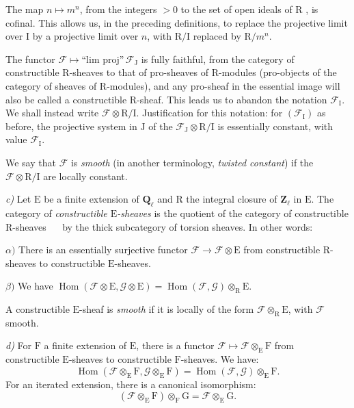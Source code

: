 \documentclass[11pt,leqno]{article}
\newcommand{\Page}[1]{\ifvmode\noindent\else\unskip\ \fi{\footnotesize\textcolor{gray}{[p.\,#1]}}\ \ignorespaces}
\begin{document}
The map \(n\mapsto m^n\), from the integers \(>0\) to the set of open ideals of \(\mathrm{R}\) , is cofinal. This allows us, in the preceding definitions, to replace the projective limit over \(\mathrm{I}\) by a projective limit over \(n\), with \(\mathrm{R}/\mathrm{I}\) replaced by \(\mathrm{R}/m^n\).

The functor \(\mathscr{F}\mapsto\text{“lim proj”}\,\mathscr{F}_{\mathrm{J}}\) is fully faithful, from the category of constructible \(\mathrm{R}\)-sheaves to that of pro-sheaves of \(\mathrm{R}\)-modules (pro-objects of the category of sheaves of \(\mathrm{R}\)-modules), and any pro-sheaf in the essential image will also be called a constructible \(\mathrm{R}\)-sheaf. This leads us to abandon the notation \(\mathscr{F}_{\mathrm{I}}\). We shall instead write \(\mathscr{F}\otimes\mathrm{R}/\mathrm{I}\). Justification for this notation: for \((\mathscr{F}_{\mathrm{I}})\) as before, the projective system in \(\mathrm{J}\) of the \(\mathscr{F}_{\mathrm{J}}\otimes\mathrm{R}/\mathrm{I}\) is essentially constant, with value \(\mathscr{F}_{\mathrm{I}}\).

We say that \(\mathscr{F}\) is \textit{smooth} (in another terminology, \textit{twisted constant}) if the \(\mathscr{F}\otimes\mathrm{R}/\mathrm{I}\) are locally constant.

\textit{c)} Let \(\mathrm{E}\) be a finite extension of \(\mathbf{Q}_\ell\) and \(\mathrm{R}\) the integral closure of \(\mathbf{Z}_\ell\) in \(\mathrm{E}\). The category of \textit{constructible \(\mathrm{E}\)-sheaves} is the quotient of the category of constructible \(\mathrm{R}\)-sheaves \Page{147}
by the thick subcategory of torsion sheaves. In other words:

\noindent \(\alpha)\) There is an essentially surjective functor \(\mathscr{F}\to\mathscr{F}\otimes\mathrm{E}\) from constructible \(\mathrm{R}\)-sheaves to constructible \(\mathrm{E}\)-sheaves.

\noindent \(\beta)\) We have \(\operatorname{Hom}(\mathscr{F}\otimes\mathrm{E},\mathscr{G}\otimes\mathrm{E})=\operatorname{Hom}(\mathscr{F},\mathscr{G})\otimes_{\mathrm{R}}\mathrm{E}\).

A constructible \(\mathrm{E}\)-sheaf is \textit{smooth} if it is locally of the form \(\mathscr{F}\otimes_{\mathrm{R}}\mathrm{E}\), with \(\mathscr{F}\) smooth.

\textit{d)} For \(\mathrm{F}\) a finite extension of \(\mathrm{E}\), there is a functor \(\mathscr{F}\mapsto\mathscr{F}\otimes_{\mathrm{E}}\mathrm{F}\) from constructible \(\mathrm{E}\)-sheaves to constructible \(\mathrm{F}\)-sheaves. We have:
\[
\operatorname{Hom}(\mathscr{F}\otimes_{\mathrm{E}}\mathrm{F},\mathscr{G}\otimes_{\mathrm{E}}\mathrm{F})
=\operatorname{Hom}(\mathscr{F},\mathscr{G})\otimes_{\mathrm{E}}\mathrm{F}.
\]
For an iterated extension, there is a canonical isomorphism:
\[
(\mathscr{F}\otimes_{\mathrm{E}}\mathrm{F})\otimes_{\mathrm{F}}\mathrm{G}
=\mathscr{F}\otimes_{\mathrm{E}}\mathrm{G}.
\tag*{(1)}
\]
\end{document}
